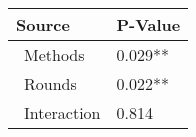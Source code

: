 
\centering
\begin{tabular}{ll}
\toprule
          Source & P-Value \\
\midrule
    \    Methods & 0.029** \\
     \    Rounds & 0.022** \\
\    Interaction &   0.814 \\
\bottomrule
\end{tabular}
